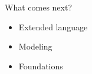 \begin{frame}{What comes next?}
\vfill
\begin{itemize}
\item
Extended language
\bigskip
\item 
Modeling
\bigskip
\item
Foundations
\end{itemize}
\vfill
\end{frame}
